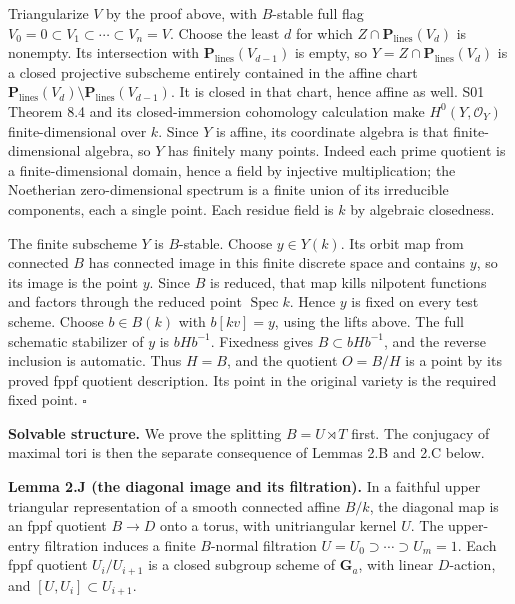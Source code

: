 \documentclass[11pt,a4paper,openany]{report}
\newcounter{none}
\begin{document}
Triangularize \(V\) by the proof above, with \(B\)-stable full flag \(V_0=0\subset V_1\subset\cdots\subset V_n=V\). Choose the least \(d\) for which \(Z\cap\mathbf P_{\mathrm{lines}}(V_d)\) is nonempty. Its intersection with \(\mathbf P_{\mathrm{lines}}(V_{d-1})\) is empty, so \(Y=Z\cap\mathbf P_{\mathrm{lines}}(V_d)\) is a closed projective subscheme entirely contained in the affine chart \(\mathbf P_{\mathrm{lines}}(V_d)\setminus\mathbf P_{\mathrm{lines}}(V_{d-1})\). It is closed in that chart, hence affine as well. S01 Theorem 8.4 and its closed-immersion cohomology calculation make \(H^0(Y,\mathcal O_Y)\) finite-dimensional over \(k\). Since \(Y\) is affine, its coordinate algebra is that finite-dimensional algebra, so \(Y\) has finitely many points. Indeed each prime quotient is a finite-dimensional domain, hence a field by injective multiplication; the Noetherian zero-dimensional spectrum is a finite union of its irreducible components, each a single point. Each residue field is \(k\) by algebraic closedness.

The finite subscheme \(Y\) is \(B\)-stable. Choose \(y\in Y(k)\). Its orbit map from connected \(B\) has connected image in this finite discrete space and contains \(y\), so its image is the point \(y\). Since \(B\) is reduced, that map kills nilpotent functions and factors through the reduced point \(\operatorname{Spec}k\). Hence \(y\) is fixed on every test scheme. Choose \(b\in B(k)\) with \(b[kv]=y\), using the lifts above. The full schematic stabilizer of \(y\) is \(bHb^{-1}\). Fixedness gives \(B\subset bHb^{-1}\), and the reverse inclusion is automatic. Thus \(H=B\), and the quotient \(O=B/H\) is a point by its proved fppf quotient description. Its point in the original variety is the required fixed point. \(\square\)

\textbf{Solvable structure.} We prove the splitting \(B=U\rtimes T\) first. The conjugacy of maximal tori is then the separate consequence of Lemmas 2.B and 2.C below.

\textbf{Lemma 2.J (the diagonal image and its filtration).} In a faithful upper triangular representation of a smooth connected affine \(B/k\), the diagonal map is an fppf quotient \(B\to D\) onto a torus, with unitriangular kernel \(U\). The upper-entry filtration induces a finite \(B\)-normal filtration \(U=U_0\supset\cdots\supset U_m=1\). Each fppf quotient \(U_i/U_{i+1}\) is a closed subgroup scheme of \(\mathbf G_a\), with linear \(D\)-action, and \([U,U_i]\subset U_{i+1}\).
\end{document}
